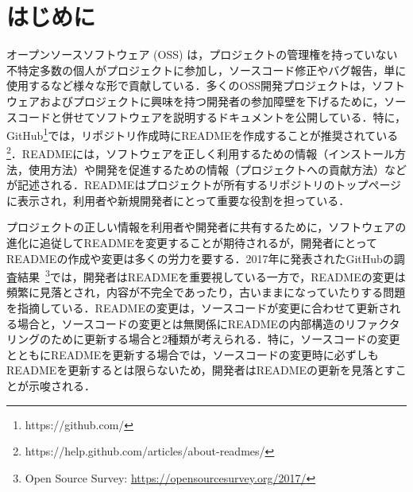 \documentclass[submit]{ipsj}
\begin{document}
\section{はじめに}



オープンソースソフトウェア (OSS) は，プロジェクトの管理権を持っていない不特定多数の個人がプロジェクトに参加し，ソースコード修正やバグ報告，単に使用するなど様々な形で貢献している．多くのOSS開発プロジェクトは，ソフトウェアおよびプロジェクトに興味を持つ開発者の参加障壁を下げるために，ソースコードと併せてソフトウェアを説明するドキュメントを公開している．特に，GitHub\footnote[1]{https://github.com/}では，リポジトリ作成時にREADMEを作成することが推奨されている\footnote[2]{https://help.github.com/articles/about-readmes/}．READMEには，ソフトウェアを正しく利用するための情報（インストール方法，使用方法）や開発を促進するための情報（プロジェクトへの貢献方法）などが記述される．READMEはプロジェクトが所有するリポジトリのトップページに表示され，利用者や新規開発者にとって重要な役割を担っている\cite{Eco2011_Mens}．


プロジェクトの正しい情報を利用者や開発者に共有するために，ソフトウェアの進化に追従してREADMEを変更することが期待されるが，開発者にとってREADMEの作成や変更は多くの労力を要する\cite{Doc_maintenance1}\cite{Doc_maintenance2}．2017年に発表されたGitHubの調査結果~\footnote[3]{Open Source Survey: \url{https://opensourcesurvey.org/2017/}}では，開発者はREADMEを重要視している一方で，READMEの変更は頻繁に見落とされ，内容が不完全であったり，古いままになっていたりする問題を指摘している．READMEの変更は，ソースコードが変更に合わせて更新される場合と，ソースコードの変更とは無関係にREADMEの内部構造のリファクタリングのために更新する場合と2種類が考えられる．特に，ソースコードの変更とともにREADMEを更新する場合では，ソースコードの変更時に必ずしもREADMEを更新するとは限らないため，開発者はREADMEの更新を見落とすことが示唆される．
\end{document}

